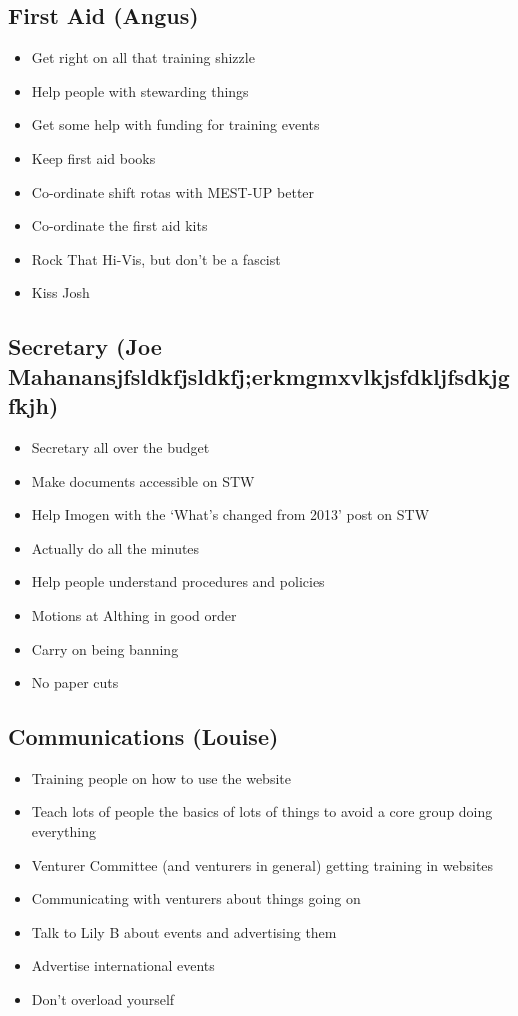\documentclass[a4paper, 11pt]{article} %
\begin{document}
\subsection{First Aid (Angus)}
\begin{itemize}
	\item Get right on all that training shizzle
	\item Help people with stewarding things
	\item Get some help with funding for training events
	\item Keep first aid books
	\item Co-ordinate shift rotas with MEST-UP better
	\item Co-ordinate the first aid kits
	\item Rock That Hi-Vis, but don't be a fascist
	\item Kiss Josh
\end{itemize}

\subsection{Secretary (Joe Mahanansjfsldkfjsldkfj;erkmgmxvlkjsfdkljfsdkjgfkjh)}
\begin{itemize}
	\item Secretary all over the budget
	\item Make documents accessible on STW
	\item Help Imogen with the `What's changed from 2013' post on STW
	\item Actually do all the minutes
	\item Help people understand procedures and policies
	\item Motions at Althing in good order
	\item Carry on being banning
	\item No paper cuts
\end{itemize}

\subsection{Communications (Louise)}
\begin{itemize}
	\item Training people on how to use the website
	\item Teach lots of people the basics of lots of things to avoid a core group doing everything
	\item Venturer Committee (and venturers in general) getting training in websites
	\item Communicating with venturers about things going on
	\item Talk to Lily B about events and advertising them
	\item Advertise international events
	\item Don't overload yourself
\end{itemize}
\end{document}
